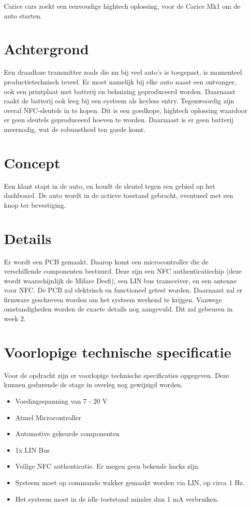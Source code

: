 Carice cars zoekt een eenvoudige hightech oplossing, voor de Carice Mk1 om de auto starten. \newline
\section{Achtergrond}
Een draadloze transmitter zoals die nu bij veel auto's is toegepast, is momenteel productietechnisch teveel. Er moet namelijk bij elke auto naast een ontvanger, ook een printplaat met batterij en behuizing geproduceerd worden. Daarnaast raakt de batterij ook leeg bij een systeem als keyless entry. \newline
Tegenwoordig zijn overal NFC-sleutels in te kopen. Dit is een goedkope, hightech oplossing waardoor er geen sleutels geproduceerd hoeven te worden. 
Daarnaast is er geen batterij meernodig, wat de robuustheid ten goede komt.

\section{Concept}
Een klant stapt in de auto, en houdt de sleutel tegen een gebied op het dashboard. De auto wordt in de actieve toestand gebracht, eventueel met een knop ter bevestiging.

\section{Details}
Er wordt een PCB gemaakt. Daarop komt een microcontroller die de verschillende componenten bestuurd. Deze zijn een NFC authenticatiechip (deze wordt waarschijnlijk de Mifare Desfi), een LIN bus transceiver, en een antenne voor NFC. 
De PCB zal elektrisch en functioneel getest worden.
Daarnaast zal er firmware geschreven worden om het systeem werkend te krijgen.
Vanwege omstandigheden worden de exacte details nog aangevuld. Dit zal gebeuren in week 2.

\section{Voorlopige technische specificatie}

Voor de opdracht zijn er voorlopige technische specificaties opgegeven. Deze kunnen gedurende de stage in overleg nog gewijzigd worden.


\begin{itemize}
	\item Voedingsspanning van 7 - 20 V
	\item Atmel Microcontroller
	\item Automotive gekeurde componenten
	\item 1x LIN Bus
	\item Veilige NFC authenticatie. Er mogen geen bekende hacks zijn.
	\item Systeem moet op commando wakker gemaakt worden via LIN, op circa 1 Hz.
	\item Het systeem moet in de idle toetstand minder dan 1 mA verbruiken.
\end{itemize}

